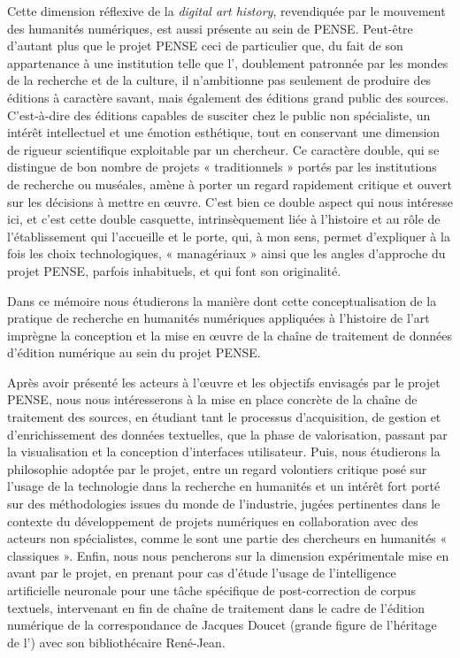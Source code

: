 Cette dimension réflexive de la \textit{digital art history}, revendiquée par le mouvement des humanités numériques, est aussi présente au sein de PENSE. Peut-être d’autant plus que le projet PENSE ceci de particulier que, du fait de son appartenance à une institution telle que l’\inha, doublement patronnée par les mondes de la recherche et de la culture, il n’ambitionne pas seulement de produire des éditions à caractère savant, mais également des éditions grand public des sources. C’est-à-dire des éditions capables de susciter chez le public non spécialiste, un intérêt intellectuel et une émotion esthétique, tout en conservant une dimension de rigueur scientifique exploitable par un chercheur. Ce caractère double, qui se distingue de bon nombre de projets « traditionnels » portés par les institutions de recherche ou muséales, amène à porter un regard rapidement critique et ouvert sur les décisions à mettre en œuvre.
C’est bien ce double aspect qui nous intéresse ici, et c’est cette double casquette, intrinsèquement liée à l’histoire et au rôle de l’établissement qui l’accueille et le porte, qui, à mon sens, permet d’expliquer à la fois les choix technologiques, « managériaux » ainsi que les angles d’approche du projet PENSE, parfois inhabituels, et qui font son originalité.



Dans ce mémoire nous étudierons la manière dont cette conceptualisation de la pratique de recherche en humanités numériques appliquées à l’histoire de l’art imprègne la conception et la mise en œuvre de la chaîne de traitement de données d’édition numérique au sein du projet PENSE. 

Après avoir présenté les acteurs à l'œuvre et les objectifs envisagés par le projet PENSE, nous nous intéresserons à la mise en place concrète de la chaîne de traitement des sources,  en étudiant tant le processus d'acquisition, de gestion et d'enrichissement des données textuelles, que la phase de valorisation, passant par la visualisation et la conception d'interfaces utilisateur.
Puis, nous étudierons la philosophie adoptée par le projet, entre un regard volontiers critique posé sur l'usage de la technologie dans la recherche en humanités et un intérêt fort porté sur des méthodologies issues du monde de l'industrie, jugées pertinentes dans le contexte du développement de projets numériques en collaboration avec des acteurs non spécialistes, comme le sont une partie des chercheurs en humanités « classiques ». 
Enfin, nous nous pencherons sur la dimension expérimentale mise en avant par le projet, en prenant pour cas d'étude l'usage de l'intelligence artificielle neuronale pour une tâche spécifique de post-correction de corpus textuels, intervenant en fin de chaîne de traitement dans le cadre de l'édition numérique de la correspondance de Jacques Doucet (grande figure de l'héritage de l'\inha) avec son bibliothécaire René-Jean.
